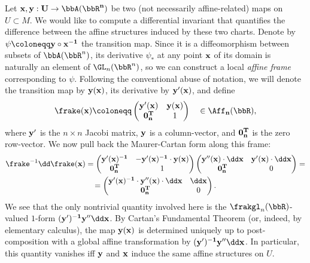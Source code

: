 \begin{example}
    Let $\bf{x},\bf{y}:U\to \bbA(\bbR^n)$ be two (not necessarily affine-related) maps on $U\subset M$. We would like to compute a differential invariant that quantifies the difference between the affine structures induced by these two charts. Denote by $\psi\coloneqq \bf{y}\circ \bf{x}^{-1}$ the transition map. Since it is a diffeomorphism between subsets of $\bbA(\bbR^n)$, its derivative $\psi_\ast$ at any point $\bf{x}$ of its domain is naturally an element of $\GL_n(\bbR^n)$, so we can construct a local \emph{affine frame} corresponding to $\psi$. Following the conventional abuse of notation, we will denote the transition map by $\bf{y}(\bf{x})$, its derivative by $\bf{y}'(\bf{x})$, and define
    \[\frake(\bf{x})\coloneqq \begin{pmatrix}
        \bf{y}'(\bf{x}) & \bf{y}(\bf{x}) \\
        \bf{0}_n^T & 1
    \end{pmatrix}\quad \in \Aff_n(\bbR),\]
    where $\bf{y}'$ is the $n\times n$ Jacobi matrix, $\bf{y}$ is a column-vector, and $\bf{0}_n^T$ is the zero row-vector. We now pull back the Maurer-Cartan form along this frame:
    \begin{multline}
        \frake^{-1}\dd\frake(\bf{x})=\begin{pmatrix}
            \bf{y}'(\bf{x})^{-1} & -\bf{y}'(\bf{x})^{-1}\cdot \bf{y}(\bf{x}) \\
            \bf{0}_n^T & 1
        \end{pmatrix}
        \begin{pmatrix}
            \bf{y}''(\bf{x})\cdot \dd \bf{x} & \bf{y}'(\bf{x})\cdot \dd \bf{x} \\
            \bf{0}_n^T & 0
        \end{pmatrix}=\\=
        \begin{pmatrix}
            \bf{y}'(\bf{x})^{-1}\cdot \bf{y}''(\bf{x})\cdot \dd \bf{x} & \dd \bf{x} \\
            \bf{0}_n^T & 0
        \end{pmatrix}.
    \end{multline}
    We see that the only nontrivial quantity involved here is the $\frakgl_n(\bbR)$-valued $1$-form $(\bf{y}')^{-1} \bf{y}'' \dd \bf{x}$. By Cartan's Fundamental Theorem (or, indeed, by elementary calculus), the map $\bf{y}(\bf{x})$ is determined uniquely up to post-composition with a global affine transformation by $(\bf{y}')^{-1} \bf{y}'' \dd \bf{x}$. In particular, this quantity vanishes iff $\bf{y}$ and $\bf{x}$ induce the same affine structures on $U$. 
    

\end{example}
